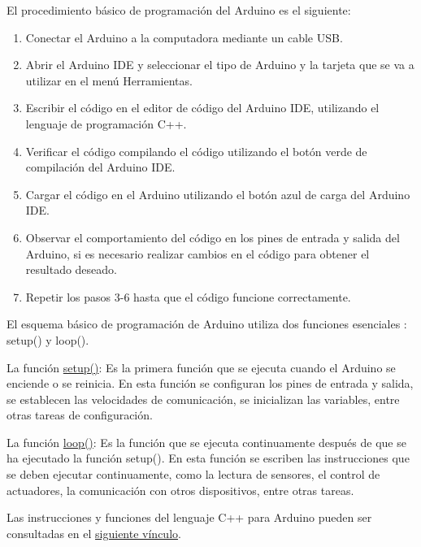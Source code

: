El procedimiento básico de programación del Arduino es el siguiente:

\begin{enumerate}
    \item Conectar el Arduino a la computadora mediante un cable USB.
    \item Abrir el Arduino IDE y seleccionar el tipo de Arduino y la tarjeta que se va a utilizar en el menú Herramientas.
    \item Escribir el código en el editor de código del Arduino IDE, utilizando el lenguaje de programación C++.
    \item Verificar el código compilando el código utilizando el botón verde de compilación del Arduino IDE.
    \item Cargar el código en el Arduino utilizando el botón azul de carga del Arduino IDE.
    \item Observar el comportamiento del código en los pines de entrada y salida del Arduino, si es necesario realizar cambios en el código para obtener el resultado deseado.
    \item Repetir los pasos 3-6 hasta que el código funcione correctamente.
\end{enumerate}

El esquema básico de programación de Arduino utiliza dos funciones esenciales \cite{margolis2020arduino}: setup() y loop().

La función \href{https://www.arduino.cc/reference/en/language/structure/sketch/setup/}{setup()}: Es la primera función que se ejecuta cuando el Arduino se enciende o se reinicia. En esta función se configuran los pines de entrada y salida, se establecen las velocidades de comunicación, se inicializan las variables, entre otras tareas de configuración. 

La función \href{https://www.arduino.cc/reference/en/language/structure/sketch/loop/}{loop()}: Es la función que se ejecuta continuamente después de que se ha ejecutado la función setup(). En esta función se escriben las instrucciones que se deben ejecutar continuamente, como la lectura de sensores, el control de actuadores, la comunicación con otros dispositivos, entre otras tareas.

Las instrucciones y funciones del lenguaje C++ para Arduino pueden ser consultadas en el \href{https://www.arduino.cc/reference/en/}{siguiente vínculo}.

\section{\pro}

